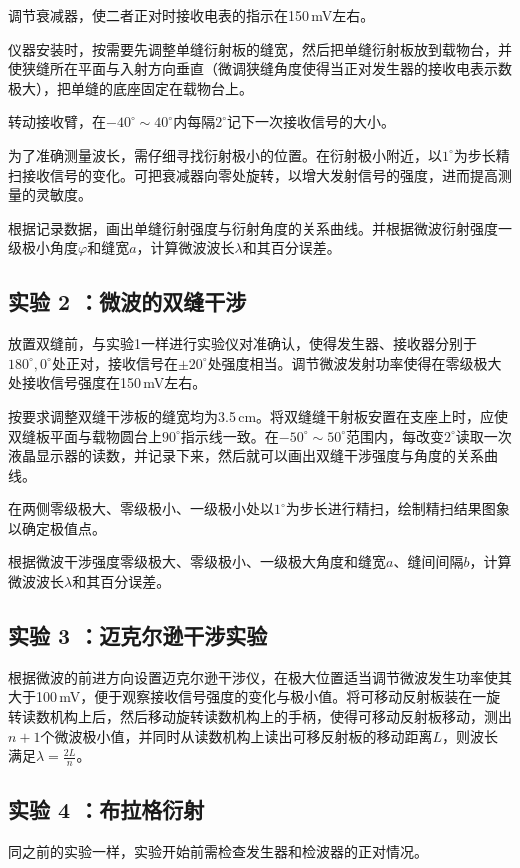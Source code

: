 \documentclass[UTF8]{article}
\theoremstyle{MyLineTheoremStyle} %
\theoremstyle{MyBlockTheoremStyle} %
\theoremstyle{MySubsubsectionStyle} %
\begin{document}
调节衰减器，使二者正对时接收电表的指示在150\,mV左右。

仪器安装时，按需要先调整单缝衍射板的缝宽，然后把单缝衍射板放到载物台，并使狭缝所在平面与入射方向垂直（微调狭缝角度使得当正对发生器的接收电表示数极大），把单缝的底座固定在载物台上。

转动接收臂，在$ -40^\circ\sim40^\circ $内每隔$ 2^\circ $记下一次接收信号的大小。

为了准确测量波长，需仔细寻找衍射极小的位置。在衍射极小附近，以$ 1^\circ $为步长精扫接收信号的变化。可把衰减器向零处旋转，以增大发射信号的强度，进而提高测量的灵敏度。

根据记录数据，画出单缝衍射强度与衍射角度的关系曲线。并根据微波衍射强度一级极小角度$ \varphi $和缝宽$a$，计算微波波长$\lambda$和其百分误差。

\subsection{实验 2 ：微波的双缝干涉}
放置双缝前，与实验1一样进行实验仪对准确认，使得发生器、接收器分别于$ 180^\circ,0^\circ $处正对，接收信号在$ \pm20^\circ $处强度相当。调节微波发射功率使得在零级极大处接收信号强度在150\,mV左右。

按要求调整双缝干涉板的缝宽均为3.5\,cm。将双缝缝干射板安置在支座上时，应使双缝板平面与载物圆台上$ 90^\circ $指示线一致。在$ -50^\circ\sim50^\circ $范围内，每改变$ 2^\circ $读取一次液晶显示器的读数，并记录下来，然后就可以画出双缝干涉强度与角度的关系曲线。

在两侧零级极大、零级极小、一级极小处以$ 1^\circ $为步长进行精扫，绘制精扫结果图象以确定极值点。

根据微波干涉强度零级极大、零级极小、一级极大角度和缝宽$a$、缝间间隔$ b $，计算微波波长$\lambda$和其百分误差。

\subsection{实验 3 ：迈克尔逊干涉实验}
根据微波的前进方向设置迈克尔逊干涉仪，在极大位置适当调节微波发生功率使其大于100\,mV，便于观察接收信号强度的变化与极小值。将可移动反射板装在一旋转读数机构上后，然后移动旋转读数机构上的手柄，使得可移动反射板移动，测出$ n+1 $个微波极小值，并同时从读数机构上读出可移反射板的移动距离$ L $，则波长满足$ \lambda=\frac{2L}{n} $。

\subsection{实验 4 ：布拉格衍射}
同之前的实验一样，实验开始前需检查发生器和检波器的正对情况。
\end{document}
